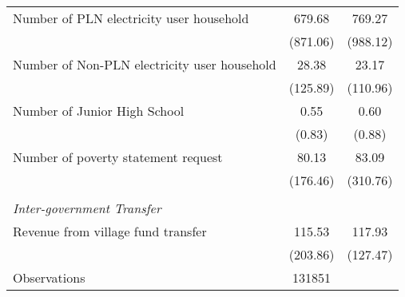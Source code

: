\begin{tabular}{l*{2}{c}}
\hspace{0.25cm} Number of PLN electricity user household&      679.68&      769.27\\
                    &    (871.06)&    (988.12)\\
\hspace{0.25cm} Number of Non-PLN electricity user household&       28.38&       23.17\\
                    &    (125.89)&    (110.96)\\
\hspace{0.25cm} Number of Junior High School&        0.55&        0.60\\
                    &      (0.83)&      (0.88)\\
\hspace{0.25cm} Number of poverty statement request&       80.13&       83.09\\
                    &    (176.46)&    (310.76)\\
\vspace{0.05em} \\ \emph{Inter-government Transfer}&            &            \\
\hspace{0.25cm} Revenue from village fund transfer&      115.53&      117.93\\
                    &    (203.86)&    (127.47)\\
\hline
Observations        &      131851&            \\
\hline\hline
\end{tabular}
